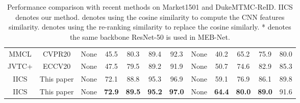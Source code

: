 \documentclass[final]{cvpr}
\begin{document}
\begin{table*}
\begin{center}
{\begin{tabular}{c|c|ccccc|ccccc}
			MMCL \cite{multi-label} & CVPR20             & None                             & 45.5                              & 80.3          & 89.4          & 92.3          & None   & 40.2          & 65.2          & 75.9          & 80.0          \\
			JVTC+ \cite{JVTC} &ECCV20                  & None                             & 47.5                              & 79.5          & 89.2          & 91.9          & None   & 50.7          & 74.6          & 82.9          & 85.3          \\ \hline
			IICS & This paper                  & None                             & 72.1                              & 88.8          & 95.3          & 96.9          & None   & 59.1          & 76.9          & 86.1          & 89.8          \\
			IICS & This paper                & None                             & \textbf{72.9}                      & \textbf{89.5}          & \textbf{95.2}          & \textbf{97.0}          & None   & \textbf{64.4}          & \textbf{80.0} & \textbf{89.0} & 91.6 \\ \hline
		\end{tabular}}
	\end{center}
	\vspace{-2mm}
	\caption{Performance comparison with recent methods on Market1501 and DukeMTMC-ReID. IICS denotes our method. \dag denotes using the cosine similarity to compute the CNN features similarity. \ddag denotes using the re-ranking similarity \cite{reranking} to replace the cosine similarly.
    * denotes the same backbone ResNet-50 is used in MEB-Net.}
	\label{sota}
\end{table*}
\end{document}
